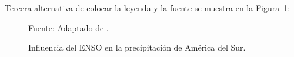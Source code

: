 Tercera alternativa de colocar la leyenda y la fuente se muestra en la Figura~\ref{fig-enso3}:

\begin{figure}[H]
\centering
\caption{Influencia del ENSO en la precipitación de América del Sur.}
%
                {Fuente: Adaptado de \cite{barr2019}.}
\label{fig-enso3}
\end{figure}